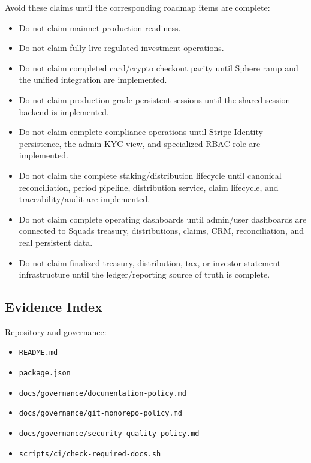 \documentclass[
  10pt,
  letterpaper,
]{article}
\providecommand{\tightlist}{%
  \setlength{\itemsep}{0pt}\setlength{\parskip}{0pt}}
\let\oldtexttt\texttt
\renewcommand{\texttt}[1]{\oldtexttt{\small #1}}
\begin{document}
Avoid these claims until the corresponding roadmap items are complete:

\begin{itemize}
\tightlist
\item
  Do not claim mainnet production readiness.
\item
  Do not claim fully live regulated investment operations.
\item
  Do not claim completed card/crypto checkout parity until Sphere ramp
  and the unified integration are implemented.
\item
  Do not claim production-grade persistent sessions until the shared
  session backend is implemented.
\item
  Do not claim complete compliance operations until Stripe Identity
  persistence, the admin KYC view, and specialized RBAC role are
  implemented.
\item
  Do not claim the complete staking/distribution lifecycle until
  canonical reconciliation, period pipeline, distribution service, claim
  lifecycle, and traceability/audit are implemented.
\item
  Do not claim complete operating dashboards until admin/user dashboards
  are connected to Squads treasury, distributions, claims, CRM,
  reconciliation, and real persistent data.
\item
  Do not claim finalized treasury, distribution, tax, or investor
  statement infrastructure until the ledger/reporting source of truth is
  complete.
\end{itemize}

\subsection{Evidence Index}\label{evidence-index}

Repository and governance:

\begin{itemize}
\tightlist
\item
  \texttt{README.md}
\item
  \texttt{package.json}
\item
  \texttt{docs/governance/documentation-policy.md}
\item
  \texttt{docs/governance/git-monorepo-policy.md}
\item
  \texttt{docs/governance/security-quality-policy.md}
\item
  \texttt{scripts/ci/check-required-docs.sh}
\end{itemize}
\end{document}
